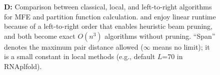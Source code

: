 \begin{figure}
{%
{\bf D:} Comparison between classical, local, and left-to-right algorithms for MFE and partition function calculation. 
    \linearfold and \linearpartition enjoy linear runtime because of a left-to-right order that  enables heuristic beam pruning,
    and both become exact $O(n^3)$ algorithms without pruning. %
    ``Span'' denotes the maximum pair distance allowed ($\infty$ means no limit);
    it is a small constant in local methods (e.g., default $L$=70 \nts in RNAplfold).
\label{fig:overview}}
\vspace{-0.3cm}
\end{figure}
